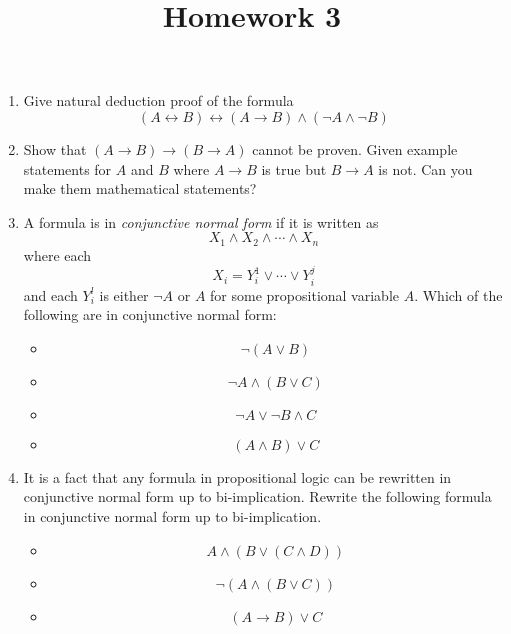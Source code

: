 \documentclass[12pt]{amsart}
\theoremstyle{definition}
\begin{document}
\title{Homework 3}

\maketitle

\begin{enumerate}
	\item Give natural deduction proof of the formula
	\begin{displaymath}
		(A \leftrightarrow B) \leftrightarrow (A \to B) \land (\neg A \land \neg B)
	\end{displaymath}

	\item Show that $(A \to B) \to (B \to A)$ cannot be proven. Given example statements 
		for $A$ and $B$ where $A \to B$ is true but $B \to A$ is not. Can you make 
		them mathematical statements?

	\item A formula is in \textit{conjunctive normal form} if it is written as 
	\begin{displaymath}
		X_1 \land X_2 \land \cdots \land X_n 
	\end{displaymath}
	where each 
	\begin{displaymath}
		X_i = Y^1_i \lor \cdots \lor Y^j_i
	\end{displaymath}
	and each $Y^l_i$ is either $\neg A$ or $A$ for some propositional variable $A$. 
	Which of the following are in conjunctive normal form:
	\begin{itemize}
		\item $$ \neg (A \lor B) $$
		\item $$ \neg A \land (B \lor C)$$
		\item $$ \neg A \lor \neg B \land C$$ 
		\item $$ (A \land B) \lor C$$
	\end{itemize}

	\item It is a fact that any formula in propositional logic can be rewritten in 
		conjunctive normal form up to bi-implication. Rewrite the following formula 
		in conjunctive normal form up to bi-implication. 
	\begin{itemize}
		\item $$A \land (B \lor (C \land D))$$ 
		\item $$\neg (A \land (B \lor C))$$
		\item $$(A \to B) \lor C$$ 
	\end{itemize}
		
		
\end{enumerate}
\end{document}
